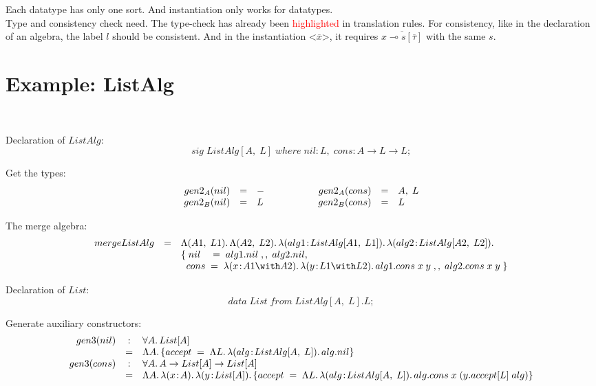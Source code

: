\documentclass[a4paper]{article}
\newcommand{\red}[1]{\textcolor{red}{#1}}
\begin{document}
Each datatype has only one sort. And instantiation only works for datatypes.\\

Type and consistency check need. The type-check has already been \red{highlighted} in translation rules. For consistency, like in the declaration of an algebra, the label $l$ should be consistent. And in the instantiation $\texttt{<}\overline{x}\texttt{>}$, it requires $\overline{x \multimap s[\overline{\tau}]}$ with the same $s$.

\section{Example: ListAlg}

~

Declaration of $ListAlg$: \[sig \; ListAlg[A, \; L] \; where \; nil : L, \; cons : A \to L \to L;\]

Get the types:
\[\begin{array}{rclcrcl}
    gen2_A(nil) & = & - & \hspace{.5in} & gen2_A(cons) & = & A, \; L \\
    gen2_B(nil) & = & L &               & gen2_B(cons) & = & L
\end{array}\]

The merge algebra: 
\[\begin{array}{lcl}
    mergeListAlg & = & \blam {(A1,\;L1)} {\blam {(A2,\;L2)} {\lam {alg1} {ListAlg[A1,\;L1]} {\lam {alg2} {ListAlg[A2,\;L2]} {}}}} \\
                 &   & \{ \; nil \ \ \  = \; alg1.nil \; \mergeop \;  alg2.nil, \\
                 &   & \; \; cons \; = \; \lam {x} {A1 \andop A2} {\lam {y} {L1 \andop L2} {alg1.cons \; x \; y \; \mergeop \; alg2.cons \; x \; y \;}} \}
\end{array}\]

Declaration of $List$: \[data \; List \; from \; ListAlg[A,\;L].L;\]

Generate auxiliary constructors:
\[\begin{array}{rcl}
gen3(nil) & : & \for A {List[A]} \\ 
 & = & \blam A {\{accept \; = \; \blam L {\lam {alg} {ListAlg[A, \; L]} {alg.nil}}\}} \\
gen3(cons) & : & \for A {A \to List[A] \to List[A]} \\
 & = & \blam A {\lam x A {\lam y {List[A]} {\{accept \; = \; \blam L {\lam {alg} {ListAlg[A, \; L]} {alg.cons \; x \; (y.accept[L] \; alg)}}\}}}}
\end{array}\]
\end{document}
